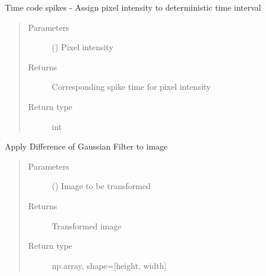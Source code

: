 \documentclass[letterpaper,10pt,english]{sphinxmanual}
\begin{document}

\begin{fulllineitems}
\label{\detokenize{SpikingConvNet:SpikingConvNet.utils.convert_time_code}}
Time code spikes - Assign pixel intensity to deterministic time interval
\begin{quote}\begin{description}
\item[{Parameters}] \leavevmode
{} () \textendash{} Pixel intensity

\item[{Returns}] \leavevmode
{} \textendash{} Corresponding spike time for pixel intensity

\item[{Return type}] \leavevmode
int

\end{description}\end{quote}

\end{fulllineitems}


\begin{fulllineitems}
\label{\detokenize{SpikingConvNet:SpikingConvNet.utils.dog_filter}}
Apply Difference of Gaussian Filter to image
\begin{quote}\begin{description}
\item[{Parameters}] \leavevmode
{} () \textendash{} Image to be transformed

\item[{Returns}] \leavevmode
{} \textendash{} Transformed image

\item[{Return type}] \leavevmode
np.array, shape={[}height, width{]}

\end{description}\end{quote}

\end{fulllineitems}
\end{document}
